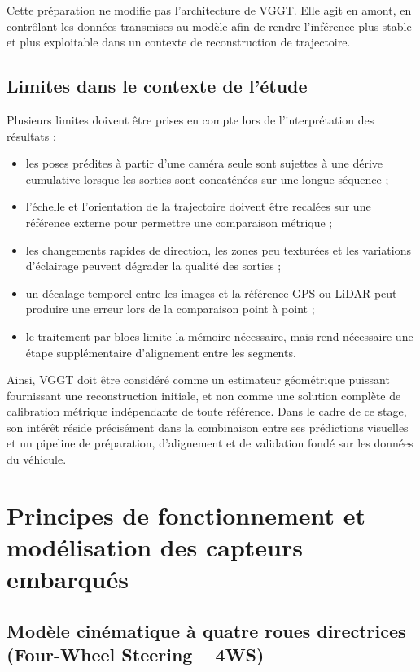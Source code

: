 \documentclass[12pt,a4paper,oneside]{report}
\begin{document}
Cette préparation ne modifie pas l'architecture de VGGT. Elle agit en amont, en contrôlant les données transmises au modèle afin de rendre l'inférence plus stable et plus exploitable dans un contexte de reconstruction de trajectoire.

\section{Limites dans le contexte de l'étude}

Plusieurs limites doivent être prises en compte lors de l'interprétation des résultats :
\begin{itemize}
    \item les poses prédites à partir d'une caméra seule sont sujettes à une dérive cumulative lorsque les sorties sont concaténées sur une longue séquence ;
    \item l'échelle et l'orientation de la trajectoire doivent être recalées sur une référence externe pour permettre une comparaison métrique ;
    \item les changements rapides de direction, les zones peu texturées et les variations d'éclairage peuvent dégrader la qualité des sorties ;
    \item un décalage temporel entre les images et la référence GPS ou LiDAR peut produire une erreur lors de la comparaison point à point ;
    \item le traitement par blocs limite la mémoire nécessaire, mais rend nécessaire une étape supplémentaire d'alignement entre les segments.
\end{itemize}

Ainsi, VGGT doit être considéré comme un estimateur géométrique puissant fournissant une reconstruction initiale, et non comme une solution complète de calibration métrique indépendante de toute référence. Dans le cadre de ce stage, son intérêt réside précisément dans la combinaison entre ses prédictions visuelles et un pipeline de préparation, d'alignement et de validation fondé sur les données du véhicule.


\chapter{Principes de fonctionnement et modélisation des capteurs embarqués}

\section{Modèle cinématique à quatre roues directrices (Four-Wheel Steering -- 4WS)}
\end{document}
